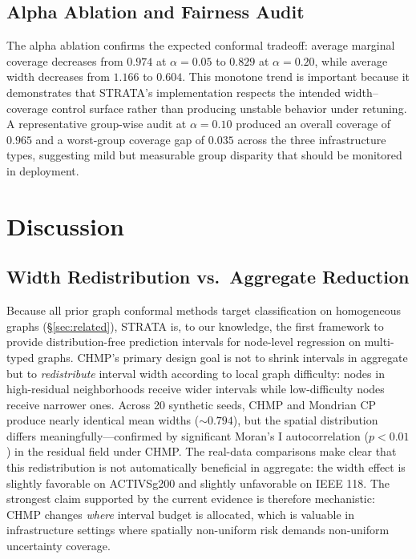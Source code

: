 \documentclass[twoside,11pt]{article}
\begin{document}
\subsection{Alpha Ablation and Fairness Audit}

The alpha ablation confirms the expected conformal tradeoff: average marginal
coverage decreases from $0.974$ at $\alpha=0.05$ to $0.829$ at $\alpha=0.20$,
while average width decreases from $1.166$ to $0.604$. This monotone trend is
important because it demonstrates that STRATA's implementation respects the
intended width--coverage control surface rather than producing unstable behavior
under retuning. A representative group-wise audit at $\alpha=0.10$ produced an
overall coverage of $0.965$ and a worst-group coverage gap of $0.035$ across the
three infrastructure types, suggesting mild but measurable group disparity that
should be monitored in deployment.

\section{Discussion}
\label{sec:discussion}

\subsection{Width Redistribution vs.\ Aggregate Reduction}

Because all prior graph conformal methods target classification on homogeneous
graphs (\S\ref{sec:related}), STRATA is, to our knowledge, the first
framework to provide distribution-free prediction intervals for node-level
regression on multi-typed graphs. CHMP's primary design goal is not to shrink
intervals in aggregate but to \emph{redistribute} interval width according to
local graph difficulty: nodes in high-residual neighborhoods receive wider
intervals while low-difficulty nodes receive narrower ones. Across 20 synthetic
seeds, CHMP and Mondrian CP produce nearly identical mean widths ($\sim 0.794$),
but the spatial distribution differs meaningfully---confirmed by significant
Moran's I autocorrelation ($p < 0.01$) in the residual field under CHMP. The
real-data comparisons make clear that this redistribution is not automatically
beneficial in aggregate: the width effect is slightly favorable on ACTIVSg200
and slightly unfavorable on IEEE 118. The strongest claim supported by the
current evidence is therefore mechanistic: CHMP changes \emph{where} interval
budget is allocated, which is valuable in infrastructure settings where
spatially non-uniform risk demands non-uniform uncertainty coverage.
\end{document}
